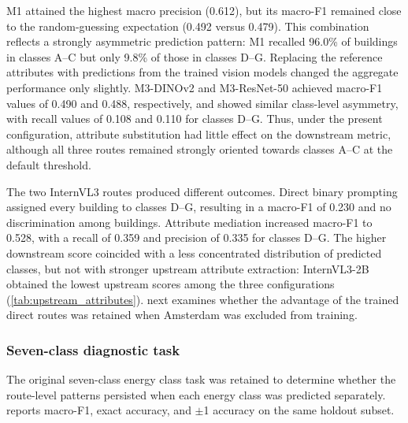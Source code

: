 M1 attained the highest macro precision (0.612), but its macro-F1 remained close to the random-guessing expectation (0.492 versus 0.479).
This combination reflects a strongly asymmetric prediction pattern: M1 recalled 96.0\% of buildings in classes A--C but only 9.8\% of those in classes D--G.
Replacing the reference attributes with predictions from the trained vision models changed the aggregate performance only slightly.
M3-DINOv2 and M3-ResNet-50 achieved macro-F1 values of 0.490 and 0.488, respectively, and showed similar class-level asymmetry, with recall values of 0.108 and 0.110 for classes D--G.
Thus, under the present configuration, attribute substitution had little effect on the downstream metric, although all three routes remained strongly oriented towards classes A--C at the default threshold.

The two InternVL3 routes produced different outcomes.
Direct binary prompting assigned every building to classes D--G, resulting in a macro-F1 of 0.230 and no discrimination among buildings.
Attribute mediation increased macro-F1 to 0.528, with a recall of 0.359 and precision of 0.335 for classes D--G.
The higher downstream score coincided with a less concentrated distribution of predicted classes, but not with stronger upstream attribute extraction: InternVL3-2B obtained the lowest upstream scores among the three configurations (\cref{tab:upstream_attributes}).
 next examines whether the advantage of the trained direct routes was retained when Amsterdam was excluded from training.

\subsubsection*{Seven-class diagnostic task}

The original seven-class energy class task was retained to determine whether the route-level patterns persisted when each energy class was predicted separately.
 reports macro-F1, exact accuracy, and $\pm$1 accuracy on the same holdout subset.

